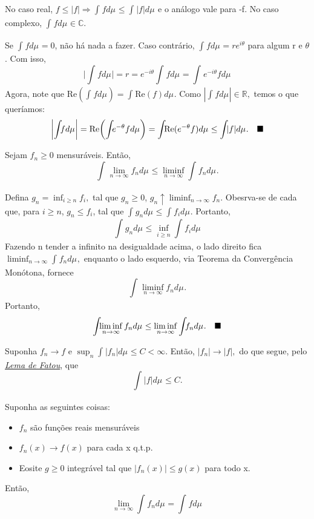 \documentclass[measure_theory.tex]{subfiles}
\begin{document}
\begin{proof*}
	No caso real, \(f \leq |f| \Rightarrow \int_{}f d\mu_{} \leq \int_{}|f| d\mu_{}\) e o análogo vale para -f. No caso complexo, \(\int_{}f d\mu_{}\in \mathbb{C}.\)

	Se \(\int_{}f d\mu_{} = 0\), não há nada a fazer. Caso contrário, \(\int_{}f d\mu_{} = re^{i\theta }\) para algum r e \(\theta \). Com isso,
	\[
		\biggl\vert \int_{}f d\mu_{} \biggr\vert = r = e^{-i\theta }\int_{}f d\mu_{} = \int_{}e^{-i\theta }f d\mu_{}
	\]
	Agora, note que \(\mathrm{Re}(\int_{}f d\mu_{}) = \int_{}\mathrm{Re}(f) d\mu_{}.\) Como \(|\int_{}f d\mu_{}|\in \mathbb{R},\) temos o que queríamos:
	\[
		\biggl\vert \int_{}f d\mu_{}  \biggr\vert = \mathrm{Re}\biggl(\int_{}e^{-\theta }f d\mu_{}\biggr) = \int_{}\mathrm{Re}(e^{-\theta }f) d\mu_{} \leq \int_{}|f| d\mu_{}.\quad \text{$\blacksquare$}
	\]
\end{proof*}
\hypertarget{fatou}{
	\begin{lemma*}[Fatou]
		Sejam \(f_{n}\geq 0\) mensuráveis. Então,
		\[
			\int_{}\lim_{n\to \infty}f_{n} d\mu_{} \leq \liminf_{n\to \infty}\int_{}f_{n} d\mu_{}.
		\]
	\end{lemma*}}
\begin{proof*}
	Defina \(g_{n} = \inf_{i\geq n}f_{i},\) tal que \(g_{n}\geq 0\),  \(g_{n}\uparrow \liminf_{n\to \infty}f_{n}\). Obesrva-se de cada que, para \(i\geq n\),
	\(g_{n}\leq f_{i}\), tal que \(\int_{}g_{n} d\mu_{} \leq \int_{}f_{i} d\mu_{}.\) Portanto,
	\[
		\int_{}g_{n} d\mu_{} \leq \inf_{i\geq n} \int_{}f_{i} d\mu_{}
	\]
	Fazendo n tender a infinito na desigualdade acima, o lado direito fica \(\liminf_{n\to \infty}\int_{}f_{n} d\mu_{},\) enquanto o lado esquerdo, via Teorema da Convergência Monótona, fornece
	\[
		\int_{}\liminf_{n\to \infty}f_{n} d\mu_{}.
	\]
	Portanto,
	\[
		\int_{}\liminf_{n\to \infty}f_{n} d\mu_{} \leq \liminf_{n\to \infty}\int_{}f_{n} d\mu_{}.\quad \text{$\blacksquare$}
	\]
\end{proof*}
\begin{example}
	Suponha \(f_{n}\longrightarrow f\) e \(\sup_{n}\int_{}|f_{n}| d\mu_{} \leq C < \infty.\) Então, \(|f_{n}|\to |f|,\) do que segue, pelo \hyperlink{fatou}{\textit{Lema de Fatou}}, que
	\[
		\int_{}|f| d\mu_{} \leq C.
	\]
\end{example}
\hypertarget{dominated_convergence}{
	\begin{theorem*}
		Suponha as seguintes coisas:
		\begin{itemize}
			\item \(f_{n}\) são funções reais mensuráveis
			\item \(f_{n}(x)\to f(x)\) para cada x q.t.p.
			\item Eosite \(g\geq 0\) integrável tal que \(|f_{n}(x)| \leq g(x)\) para todo x.
		\end{itemize}
		Então,
		\[
			\lim_{n\to \infty}\int_{}f_{n} d\mu_{} = \int_{}f d\mu_{}
		\]
	\end{theorem*}}
\end{document}
